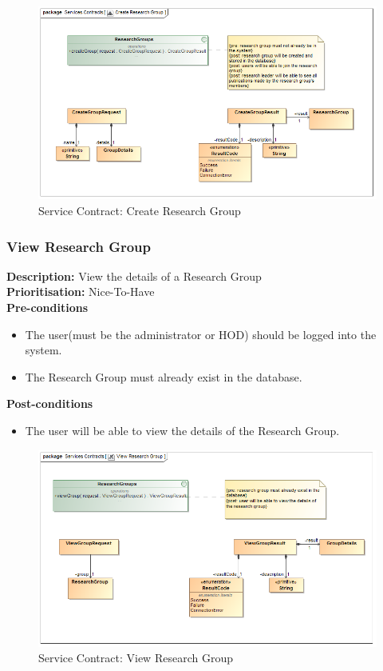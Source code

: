 \documentclass[a4paper]{article}
\begin{document}
	    	\begin{figure}[H]
	    		\centering
	    		\includegraphics[width=\textwidth]{5.1.11.Create.Research.Group.Services.Contract.png}
	    		\caption{Service Contract: Create Research Group}
	    	\end{figure}
	
	\pagebreak
	\subsubsection{View Research Group}
	\textbf{Description:} View the details of a Research Group \\
	\textbf{Prioritisation:} Nice-To-Have\\
	
	\textbf{Pre-conditions}
	 \begin{itemize}
		\item The user(must be the administrator or HOD) should be logged into the system.
		\item The Research Group must already exist in the database.
    \end{itemize}
	
	\textbf{Post-conditions}
	 \begin{itemize}
		\item The user will be able to view the details of the Research Group.
	\end{itemize}
	
	    	\begin{figure}[H]
	    		\centering
	    		\includegraphics[width=\textwidth]{5.1.12.View.Research.Group.Services.Contract.png}
	    		\caption{Service Contract: View Research Group}
	    	\end{figure}
	
\end{document}
